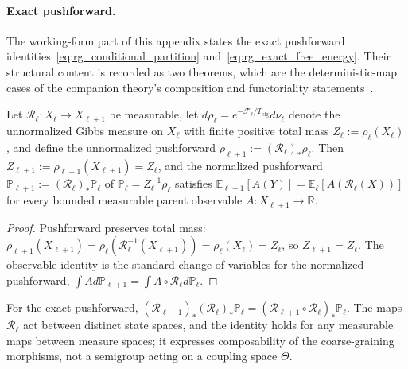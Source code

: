 \paragraph{Exact pushforward.}
The working-form part of this appendix states the exact pushforward identities~\eqref{eq:rg_conditional_partition} and~\eqref{eq:rg_exact_free_energy}. Their structural content is recorded as two theorems, which are the deterministic-map cases of the companion theory's composition and functoriality statements~\cite[Chs.~9 and 11]{DennisGaugeVFE2026}.

\begin{theorem}
\label{thm:rg_pushforward}
Let $\mathcal{R}_\ell : X_\ell \to X_{\ell+1}$ be measurable, let $d\rho_\ell = e^{-\mathcal{F}_\ell/T_{\mathrm{cfg}}}d\nu_\ell$ denote the unnormalized Gibbs measure on $X_\ell$ with finite positive total mass $Z_\ell := \rho_\ell(X_\ell)$, and define the unnormalized pushforward $\rho_{\ell+1} := (\mathcal{R}_\ell)_*\rho_\ell$. Then $Z_{\ell+1} := \rho_{\ell+1}(X_{\ell+1}) = Z_\ell$, and the normalized pushforward $\mathbb{P}_{\ell+1} := (\mathcal{R}_\ell)_*\mathbb{P}_\ell$ of $\mathbb{P}_\ell = Z_\ell^{-1}\rho_\ell$ satisfies $\mathbb{E}_{\ell+1}[A(Y)] = \mathbb{E}_\ell[A(\mathcal{R}_\ell(X))]$ for every bounded measurable parent observable $A : X_{\ell+1} \to \mathbb{R}$.
\end{theorem}

\begin{proof}
Pushforward preserves total mass: $\rho_{\ell+1}(X_{\ell+1}) = \rho_\ell(\mathcal{R}_\ell^{-1}(X_{\ell+1})) = \rho_\ell(X_\ell) = Z_\ell$, so $Z_{\ell+1} = Z_\ell$. The observable identity is the standard change of variables for the normalized pushforward, $\int A  d\mathbb{P}_{\ell+1} = \int A\circ\mathcal{R}_\ell  d\mathbb{P}_\ell$.
\end{proof}

\begin{theorem}
\label{thm:rg_semigroup}
For the exact pushforward, $(\mathcal{R}_{\ell+1})_*(\mathcal{R}_\ell)_*\mathbb{P}_\ell = (\mathcal{R}_{\ell+1} \circ \mathcal{R}_\ell)_*\mathbb{P}_\ell$. The maps $\mathcal{R}_\ell$ act between distinct state spaces, and the identity holds for any measurable maps between measure spaces; it expresses composability of the coarse-graining morphisms, not a semigroup acting on a coupling space $\Theta$.
\end{theorem}

